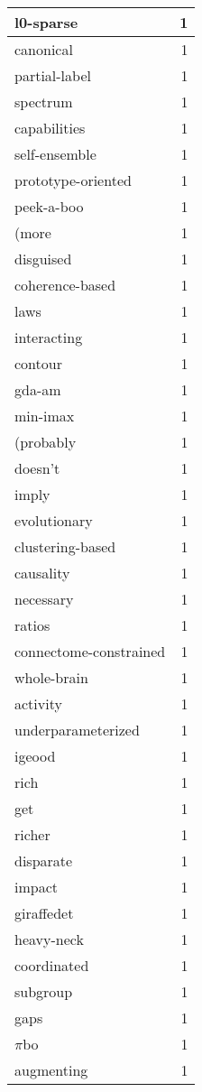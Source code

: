 \begin{table}[h]
\begin{tabular}{|l|r|}
\hline
l0-sparse & 1 \\
\hline
canonical & 1 \\
\hline
partial-label & 1 \\
\hline
spectrum & 1 \\
\hline
capabilities & 1 \\
\hline
self-ensemble & 1 \\
\hline
prototype-oriented & 1 \\
\hline
peek-a-boo & 1 \\
\hline
(more & 1 \\
\hline
disguised & 1 \\
\hline
coherence-based & 1 \\
\hline
laws & 1 \\
\hline
interacting & 1 \\
\hline
contour & 1 \\
\hline
gda-am & 1 \\
\hline
min-imax & 1 \\
\hline
(probably & 1 \\
\hline
doesn't & 1 \\
\hline
imply & 1 \\
\hline
evolutionary & 1 \\
\hline
clustering-based & 1 \\
\hline
causality & 1 \\
\hline
necessary & 1 \\
\hline
ratios & 1 \\
\hline
connectome-constrained & 1 \\
\hline
whole-brain & 1 \\
\hline
activity & 1 \\
\hline
underparameterized & 1 \\
\hline
igeood & 1 \\
\hline
rich & 1 \\
\hline
get & 1 \\
\hline
richer & 1 \\
\hline
disparate & 1 \\
\hline
impact & 1 \\
\hline
giraffedet & 1 \\
\hline
heavy-neck & 1 \\
\hline
coordinated & 1 \\
\hline
subgroup & 1 \\
\hline
gaps & 1 \\
\hline
$\pi$bo & 1 \\
\hline
augmenting & 1 \\

\end{tabular}
\end{table}
